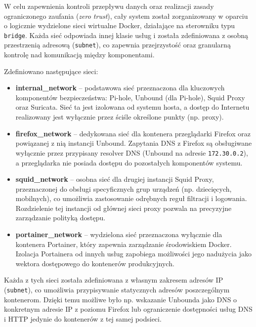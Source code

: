 \documentclass[
    left=2.5cm,         %
    right=2.5cm,        %
    top=2.5cm,          %
    bottom=3cm,         %
    bindingoffset=6mm,  %
    nohyphenation=true %
]{eiti/eiti-thesis} %
\begin{document}
W celu zapewnienia kontroli przepływu danych oraz realizacji zasady ograniczonego zaufania (\textit{zero trust}), cały system został zorganizowany w oparciu o logicznie wydzielone sieci wirtualne Docker, działające na sterowniku typu \texttt{bridge}. Każda sieć odpowiada innej klasie usług i została zdefiniowana z osobną przestrzenią adresową (\texttt{subnet}), co zapewnia przejrzystość oraz granularną kontrolę nad komunikacją między komponentami.

Zdefiniowano następujące sieci:

\begin{itemize}
    \item \textbf{internal\_network} – podstawowa sieć przeznaczona dla kluczowych komponentów bezpieczeństwa: Pi-hole, Unbound (dla Pi-hole), Squid Proxy oraz Suricata. Sieć ta jest izolowana od systemu hosta, a dostęp do Internetu realizowany jest wyłącznie przez ściśle określone punkty (np. proxy).
    \item \textbf{firefox\_network} – dedykowana sieć dla kontenera przeglądarki Firefox oraz powiązanej z nią instancji Unbound. Zapytania DNS z Firefox są obsługiwane wyłącznie przez przypisany resolver DNS (Unbound na adresie \texttt{172.30.0.2}), a przeglądarka nie posiada dostępu do pozostałych komponentów systemu.
    \item \textbf{squid\_network} – osobna sieć dla drugiej instancji Squid Proxy, przeznaczonej do obsługi specyficznych grup urządzeń (np. dziecięcych, mobilnych), co umożliwia zastosowanie odrębnych reguł filtracji i logowania. Rozdzielenie tej instancji od głównej sieci proxy pozwala na precyzyjne zarządzanie polityką dostępu.
    \item \textbf{portainer\_network} – wydzielona sieć przeznaczona wyłącznie dla kontenera Portainer, który zapewnia zarządzanie środowiskiem Docker. Izolacja Portainera od innych usług zapobiega możliwości jego nadużycia jako wektora dostępowego do kontenerów produkcyjnych.
\end{itemize}

Każda z tych sieci została zdefiniowana z własnym zakresem adresów IP (\texttt{subnet}), co umożliwia przypisywanie statycznych adresów poszczególnym kontenerom. Dzięki temu możliwe było np. wskazanie Unbounda jako DNS o konkretnym adresie IP z poziomu Firefox lub ograniczenie dostępności usług DNS i HTTP jedynie do kontenerów z tej samej podsieci.
\end{document}
